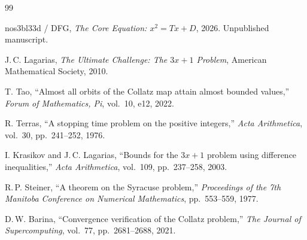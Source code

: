 \documentclass[11pt,a4paper]{article}
\theoremstyle{definition}
\begin{document}
\begin{thebibliography}{99}

nos3bl33d / DFG,
\emph{The Core Equation: $x^2 = Tx + D$},
2026. Unpublished manuscript.

J.\,C. Lagarias,
\emph{The Ultimate Challenge: The $3x+1$ Problem},
American Mathematical Society, 2010.

T. Tao,
``Almost all orbits of the Collatz map attain almost bounded values,''
\emph{Forum of Mathematics, Pi}, vol.~10, e12, 2022.

R. Terras,
``A stopping time problem on the positive integers,''
\emph{Acta Arithmetica}, vol.~30, pp.~241--252, 1976.

I. Krasikov and J.\,C. Lagarias,
``Bounds for the $3x+1$ problem using difference inequalities,''
\emph{Acta Arithmetica}, vol.~109, pp.~237--258, 2003.

R.\,P. Steiner,
``A theorem on the Syracuse problem,''
\emph{Proceedings of the 7th Manitoba Conference on Numerical Mathematics},
pp.~553--559, 1977.

D.\,W. Barina,
``Convergence verification of the Collatz problem,''
\emph{The Journal of Supercomputing}, vol.~77, pp.~2681--2688, 2021.

\end{thebibliography}
\end{document}
